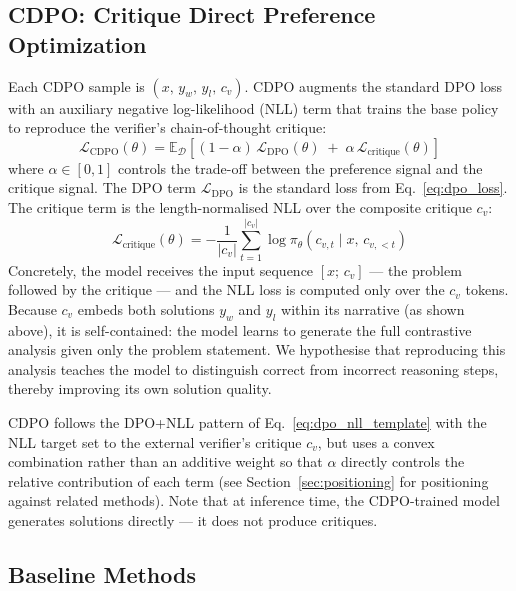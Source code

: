 \documentclass[11pt]{article}
\begin{document}
\subsection{CDPO: Critique Direct Preference Optimization}
\label{sec:cdpo}

Each CDPO sample is $(x,\, y_w,\, y_l,\, c_v)$. CDPO augments the standard DPO loss with an auxiliary negative log-likelihood (NLL) term that trains the base policy to reproduce the verifier's chain-of-thought critique:
\begin{equation}
    \mathcal{L}_{\text{CDPO}}(\theta) = \mathbb{E}_{\mathcal{D}}\!\left[(1 - \alpha)\,\mathcal{L}_{\text{DPO}}(\theta) \;+\; \alpha\,\mathcal{L}_{\text{critique}}(\theta)\right]
    \label{eq:cdpo_loss}
\end{equation}
where $\alpha \in [0, 1]$ controls the trade-off between the preference signal and the critique signal. The DPO term $\mathcal{L}_{\text{DPO}}$ is the standard loss from Eq.~\eqref{eq:dpo_loss}. The critique term is the length-normalised NLL over the composite critique $c_v$:
\begin{equation}
    \mathcal{L}_{\text{critique}}(\theta) = -\frac{1}{|c_v|}\sum_{t=1}^{|c_v|} \log \pi_\theta(c_{v,t} \mid x,\, c_{v,<t})
    \label{eq:cdpo_nll}
\end{equation}
Concretely, the model receives the input sequence $[x;\, c_v]$ --- the problem followed by the critique --- and the NLL loss is computed only over the $c_v$ tokens. Because $c_v$ embeds both solutions $y_w$ and $y_l$ within its narrative (as shown above), it is self-contained: the model learns to generate the full contrastive analysis given only the problem statement. We hypothesise that reproducing this analysis teaches the model to distinguish correct from incorrect reasoning steps, thereby improving its own solution quality.

CDPO follows the DPO+NLL pattern of Eq.~\eqref{eq:dpo_nll_template} with the NLL target set to the external verifier's critique $c_v$, but uses a convex combination rather than an additive weight so that $\alpha$ directly controls the relative contribution of each term (see Section~\ref{sec:positioning} for positioning against related methods). Note that at inference time, the CDPO-trained model generates solutions directly --- it does not produce critiques.

\subsection{Baseline Methods}
\label{sec:baselines}
\end{document}
